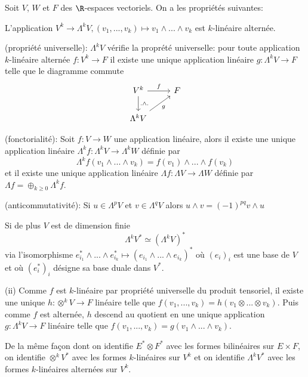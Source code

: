 \begin{pro}
Soit $V$, $W$ et $F$ des $\R$-espaces vectoriels. On a les propriétés suivantes:
\be
	\item L'application $V^k \to \Lambda^k V, (v_1, ..., v_k) \mapsto v_1 \wedge ... \wedge v_k$ est $k$-linéaire alternée.
	\item (propriété universelle): $\Lambda^k V$ vérifie la proprété universelle: pour toute application $k$-linéaire alternée $f: V^k \to F$ il existe une unique application linéaire $g : \Lambda^k V \to F$ telle que le diagramme commute
	$$\begin{tikzcd}
	V^k \arrow[r, "f"]  \arrow[d, ".\wedge ."] & F \\
	\Lambda^kV \arrow[ru, "g"']& 
	\end{tikzcd}$$
	\item (fonctorialité):  Soit $f: V \to W$ une application linéaire, alors il existe une unique application linéaire $\Lambda^k f : \Lambda^k V \to \Lambda^k W$ définie par
	$$\Lambda^k f (v_1\wedge ... \wedge v_k) = f(v_1) \wedge ... \wedge f(v_k)$$
	et il existe une unique application linéaire $\Lambda f : \Lambda V \to \Lambda W$ définie par $\Lambda f = \oplus_{k\geq 0} \Lambda^k f$. \\
	\item (anticommutativité): Si $u \in \Lambda^p V$ et $v \in \Lambda^q V$ alors $u\wedge v = (-1)^{pq} v\wedge u$
	\item Si de plus $V$ est de dimension finie
	$$\Lambda^k V^* \simeq (\Lambda^k V)^*$$ 
	via l'isomorphisme $e_{i_1}^* \wedge ...\wedge e_{i_k}^* \mapsto (e_{i_1} \wedge ... \wedge e_{i_k})^*$ où $(e_i)_i$ est une base de $V$ et où $(e_i^*)_i$ désigne sa base duale dans $V^*$.
\ee
\end{pro}
\begin{preu}
(ii) Comme $f$ est $k$-linéaire par propriété universelle du produit tensoriel, il existe une unique $h: \otimes^k V \to F$ linéaire telle que $f(v_1, ..., v_k) = h(v_1 \otimes ... \otimes v_k)$. Puis comme $f$ est alternée, $h$ descend au quotient en une unique application $g: \Lambda^k V \to F$ linéaire telle que $f(v_1, ..., v_k) = g(v_1\wedge ...\wedge v_k)$.   
\end{preu}

De la même façon dont on identifie $E^*\otimes F^*$ avec les formes bilinéaires sur $E\times F$, on identifie $\otimes^k V^*$ avec les formes $k$-linéaires sur $V^k$ et on identifie $\Lambda^k V^*$ avec les formes $k$-linéaires alternées sur $V^k$. \\

